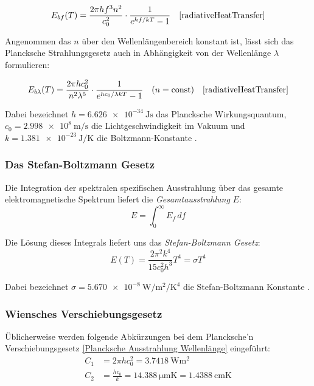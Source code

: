 \documentclass[12pt,a4paper]{article}
\begin{document}
\begin{equation}
  \label{Plancksche Ausstrahlung Frequenz}
  E_{bf}(T) = \frac{2\pi h f^3 n^2}{c_0^2} \cdot \frac{1}{e^{hf/kT}-1} 
  \quad \text{\cite[S.8]{radiativeHeatTransfer}}
\end{equation}

Angenommen das $n$ über den Wellenlängenbereich konstant ist, lässt sich das Plancksche Strahlungsgesetz auch in Abhängigkeit von der Wellenlänge $\lambda$ formulieren:

\begin{equation}
  \label{Plancksche Ausstrahlung Wellenlänge}
  E_{b\lambda}(T) = \frac{2\pi h c_0^2}{n^2\lambda^5} \cdot \frac{1}{e^{hc_0/\lambda kT}-1}
  \quad (n = \text{const}) \quad \text{\cite[S.9]{radiativeHeatTransfer}}
\end{equation}

Dabei bezeichnet $h = \SI{6.626e-34}{\joule\second}$ das Plancksche Wirkungsquantum, 
$c_0 = \SI{2.998e8}{\meter\per\second}$ die Lichtgeschwindigkeit im Vakuum 
und $k = \SI{1.381e-23}{\joule\per\kelvin}$ die Boltzmann-Konstante \cite{codata2018}.

\subsubsection{Das Stefan-Boltzmann Gesetz}
Die Integration der spektralen spezifischen Ausstrahlung über das gesamte elektromagnetische Spektrum liefert
die \textit{Gesamtausstrahlung} $E$:
\begin{equation}
  E = \int_{0}^{\infty}E_f \, df
\end{equation}

Die Lösung dieses Integrals liefert uns das \textit{Stefan-Boltzmann Gesetz}:
\begin{equation}
  E(T) = \frac{2\pi^2k^4}{15c_0^2h^3}T^4 = \sigma T^4
\end{equation}
\cite{stefanBoltzmannLaw}

Dabei bezeichnet $\sigma = \SI{5.670e-8}{\watt\per\meter\squared\per\kelvin\tothe{4}}$  die Stefan-Boltzmann Konstante \cite{codata2018}.

\subsubsection{Wiensches Verschiebungsgesetz}
Üblicherweise werden folgende Abkürzungen bei dem Plancksche'n Verschiebungsgesetz \eqref{Plancksche Ausstrahlung Wellenlänge} eingeführt:
\begin{align}
  C_1 &= 2\pi h c_0^2 = \SI{3.7418}{\watt\meter\squared} \\
  C_2 &= \frac{hc_0}{k} = \SI{14.388}{\micro\meter\kelvin} = \SI{1.4388}{\centi\meter\kelvin}
\end{align}
\end{document}

